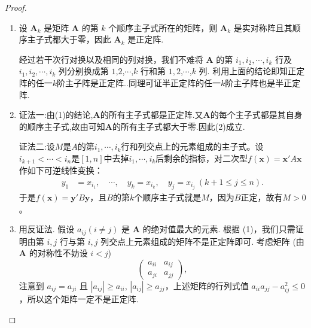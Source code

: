 \documentclass[../../main.tex]{subfiles}
\begin{document}
\begin{proof}
\begin{enumerate}[(1)]
\item 设 $\boldsymbol{A}_k$ 是矩阵 $\boldsymbol{A}$ 的第 $k$ 个顺序主子式所在的矩阵，则 $\boldsymbol{A}_k$ 是实对称阵且其顺序主子式都大于零，因此 $\boldsymbol{A}_k$ 是正定阵.

经过若干次行对换以及相同的列对换，我们不难将 $\boldsymbol{A}$ 的第 $i_1,i_2,\cdots,i_k$ 行及 $i_1,i_2,\cdots,i_k$ 列分别换成第 $1$,$2$,$\cdots$,$k$ 行和第 $1,2$,$\cdots$,$k$ 列. 利用上面的结论即知正定阵的任一$k$阶主子阵是正定阵..同理可证半正定阵的任一$k$阶主子阵也是半正定阵.

\item {\color{blue}证法一:}由(1)的结论,$\boldsymbol{A}$的所有主子式都是正定阵.又$\boldsymbol{A}$的每个主子式都是其自身的顺序主子式,故由可知$\boldsymbol{A}$的所有主子式都大于零.因此(2)成立.

{\color{blue}证法二:}设\(M\)是\(A\)的第\(i_1,\cdots,i_k\)行和列交点上的元素组成的主子式。设\(i_{k + 1}<\cdots < i_n\)是\([1,n]\)中去掉\(i_1,\cdots,i_k\)后剩余的指标，对二次型\(f(\boldsymbol{x})=\boldsymbol{x}'A\boldsymbol{x}\)作如下可逆线性变换：
\begin{align*}
y_1&=x_{i_1},\quad\cdots,\quad y_k = x_{i_k},\quad y_j = x_{i_j}\ (k + 1\leq j\leq n).
\end{align*}
于是\(f(\boldsymbol{x})=\boldsymbol{y}'B\boldsymbol{y}\)，且\(B\)的第\(k\)个顺序主子式就是\(M\)，因为\(B\)正定，故有\(M > 0\)。

\item 用反证法. 假设 $a_{ij}(i\neq j)$ 是 $\boldsymbol{A}$ 的绝对值最大的元素. 根据 (1)，我们只需证明由第 $i,j$ 行与第 $i,j$ 列交点上元素组成的矩阵不是正定阵即可. 考虑矩阵 (由 $\boldsymbol{A}$ 的对称性不妨设 $i < j$)
\[
\begin{pmatrix}
a_{ii} & a_{ij}\\
a_{ji} & a_{jj}
\end{pmatrix},
\]
注意到 $a_{ij} = a_{ji}$ 且 $|a_{ij}|\geq a_{ii}$, $|a_{ij}|\geq a_{jj}$，上述矩阵的行列式值 $a_{ii}a_{jj}-a_{ij}^2\leq 0$，所以这个矩阵一定不是正定阵. 
\end{enumerate}
\end{proof}
\end{document}
